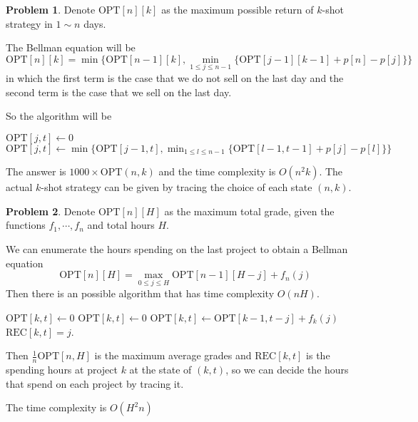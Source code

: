 \documentclass[a4paper]{article}
\theoremstyle{definition}
\newtheorem{problem}{Problem}
\theoremstyle{plain}
\newcommand{\OPT}{\mathrm{OPT}}
\numberwithin{equation}{problem}
\begin{document}
\begin{problem}
    Denote  $ \OPT[n][k] $ as  the maximum possible return of  $ k $-shot strategy  in  $ 1\sim n $ days.
    
    The Bellman equation will be 
    \[\OPT[n][k]=\min\{\OPT[n-1][k],\min_{1 \leq j \leq n-1}\{\OPT[j-1][k-1]+p[n]-p[j]\}\}\]
    in which the first term is the case that we do not sell on the last day and the second term is the case that we sell on the last day.

    So the algorithm will be 

    \begin{algorithm}
        \caption{$ \OPT $}
        \begin{algorithmic}[1]
            \STATE $ \OPT[j,t]\leftarrow0 $  \ENDIF 
            \STATE $ \OPT[j,t]\leftarrow\min\{\OPT[j-1,t],\min_{1 \leq l \leq n-1}\{\OPT[l-1,t-1]+p[j]-p[l]\}\} $ 
            \ENDFOR
        \end{algorithmic}
    \end{algorithm}

    The answer is  $ 1000\times \OPT(n,k) $ and  the time complexity is  $ O(n^2k) $. The actual   $ k $-shot strategy can be given by tracing the choice of each state  $ (n,k) $.  
\end{problem}
\begin{problem}
    Denote  $ \OPT[n][H] $ as the maximum total grade,  given the functions  $ f_1,\cdots,f_n $ and total hours  $ H $.
    
    We can enumerate the hours spending on the last project to obtain a Bellman equation 
    \[\OPT[n][H]=\max_{0 \leq j \leq H}\OPT[n-1][H-j]+f_n(j)\]
    Then there is an possible algorithm that has time complexity  $ O(nH) $.
    
    \begin{algorithm}
        \caption{$ \OPT $}
        \begin{algorithmic}[1]
            \STATE $ \OPT[k,t]\leftarrow0 $  \ENDIF 
            \STATE  $ \OPT[k,t]\leftarrow 0 $ 
                \IF{ $ \OPT[k,t] \leq \OPT[k-1,t-j]+f_k(j) $}
                    \STATE $ \OPT[k,t]\leftarrow \OPT[k-1,t-j]+f_k(j)$
                    \STATE  $ \mathrm{REC}[k,t]=j $.
                \ENDIF 
            \ENDFOR 
            \ENDFOR
        \end{algorithmic}
    \end{algorithm}
    
    Then  $ \frac{1}{n}\OPT[n,H] $ is the maximum average grades and  $ \mathrm{REC}[k,t] $ is the spending hours at project  $ k $   
    at the state of  $ (k,t) $, so we can decide the hours that spend on each project by tracing it.
    
    The time complexity is  $ O(H^2n) $ 
\end{problem}
\end{document}
